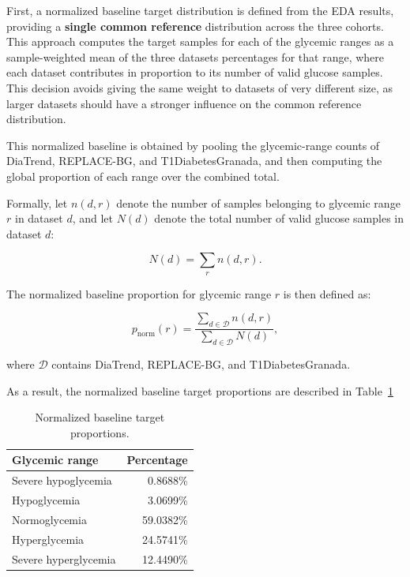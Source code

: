 First, a normalized baseline target distribution is defined from the EDA results, providing a \textbf{single common reference} distribution across the three cohorts. This approach computes the target samples for each of the glycemic ranges as a sample-weighted mean of the three datasets percentages for that range, where each dataset contributes in proportion to its number of valid glucose samples. This decision avoids giving the same weight to datasets of very different size, as larger datasets should have a stronger influence on the common reference distribution.

This normalized baseline is obtained by pooling the glycemic-range counts of DiaTrend, REPLACE-BG, and T1DiabetesGranada, and then computing the global proportion of each range over the combined total.

Formally, let $n(d,r)$ denote the number of samples belonging to glycemic range $r$ in dataset $d$, and let $N(d)$ denote the total number of valid glucose samples in dataset $d$:

\[
N(d) = \sum_{r} n(d,r).
\]

The normalized baseline proportion for glycemic range $r$ is then defined as:

\[
p_{\mathrm{norm}}(r)
=
\frac{\displaystyle\sum_{d \in \mathcal{D}} n(d,r)}
{\displaystyle\sum_{d \in \mathcal{D}} N(d)},
\]

where $\mathcal{D}$ contains DiaTrend, REPLACE-BG, and T1DiabetesGranada.

As a result, the normalized baseline target proportions are described in Table~\ref{tab:normalized_baseline_proportions}

\begin{table}[htbp]
    \centering
    \caption{Normalized baseline target proportions.}
    \label{tab:normalized_baseline_proportions}
    \begin{tabular}{lr}
        \hline
        \textbf{Glycemic range} & \textbf{Percentage} \\
        \hline
        Severe hypoglycemia & 0.8688\% \\
        Hypoglycemia & 3.0699\% \\
        Normoglycemia & 59.0382\% \\
        Hyperglycemia & 24.5741\% \\
        Severe hyperglycemia & 12.4490\% \\
        \hline
    \end{tabular}
\end{table}

